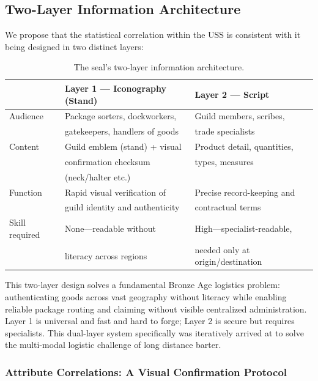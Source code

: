\documentclass[12pt]{article}
\begin{document}
\subsection{Two-Layer Information Architecture}

We propose that the statistical correlation within the USS is consistent with
it being designed in two distinct layers:

\begin{table}[H]
\centering
\caption{The seal's two-layer information architecture.}
\label{tab:two_layer_inferences}
\begin{tabular}{@{}lll@{}}
\toprule
 & \textbf{Layer 1 --- Iconography (Stand)} & 
   \textbf{Layer 2 --- Script} \\
\midrule
Audience & Package sorters, dockworkers, & Guild members, scribes, \\
 & gatekeepers, handlers of goods & trade specialists \\
Content & Guild emblem (stand) + visual & Product detail, quantities, \\
 & confirmation checksum & types, measures \\
 & (neck/halter etc.) & \\
Function & Rapid visual verification of & Precise record-keeping and \\
 & guild identity and authenticity & contractual terms \\
Skill required & None—readable without & High—specialist-readable, \\
 & literacy across regions & needed only at origin/destination \\
\bottomrule
\end{tabular}
\end{table}

This two-layer design solves a fundamental Bronze Age logistics problem:
authenticating goods across vast geography without literacy while enabling
reliable package routing and claiming without visible centralized administration.
Layer 1 is universal and fast and hard to forge; Layer 2 is secure but requires
specialists. This dual-layer system specifically was iteratively arrived at
to solve the multi-modal logistic challenge of long distance barter.

\subsubsection{Attribute Correlations: A Visual Confirmation Protocol}
\label{subsec:correlations}
\end{document}
